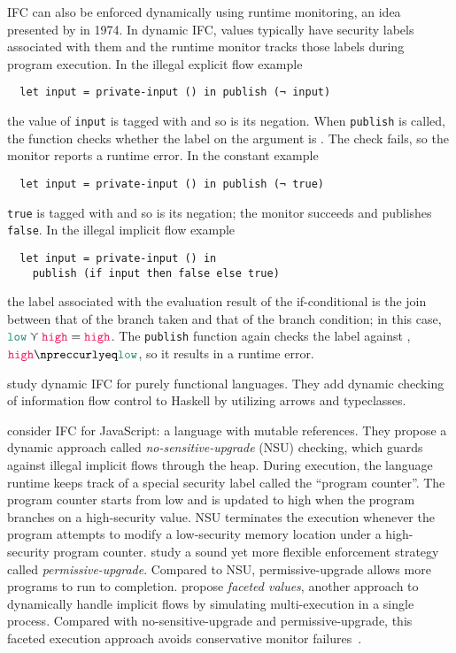 IFC can also be enforced dynamically using runtime monitoring, an idea presented
by \textcite{fenton1974memoryless} in 1974. In dynamic IFC, values typically
have security labels associated with them and the runtime monitor tracks those
labels during program execution. In the illegal explicit flow example
\begin{verbatim}
  let input = private-input () in publish (¬ input)
\end{verbatim}
the value of \texttt{input} is tagged with \high and so is its negation. When
\texttt{publish} is called, the function checks whether the label on the
argument is \low. The check fails, so the monitor reports a runtime error. In
the constant example
\begin{verbatim}
  let input = private-input () in publish (¬ true)
\end{verbatim}
\texttt{true} is tagged with \low and so is its negation; the monitor succeeds
and publishes \texttt{false}. In the illegal implicit flow example
\begin{verbatim}
  let input = private-input () in
    publish (if input then false else true)
\end{verbatim}
the label associated with the evaluation result of the if-conditional is the
join between that of the branch taken and that of the branch condition; in this
case, $\low \curlyvee \high = \high$. The \texttt{publish} function again checks
the label against \low, $\high \npreccurlyeq \low$, so it results in a runtime
error.

\textcite{li2006encoding,LI20101974} study dynamic IFC for purely functional
languages. They add dynamic checking of information flow control to Haskell by
utilizing arrows and typeclasses.

\textcite{austin2009efficient} consider IFC for JavaScript: a language with
mutable references. They propose a dynamic approach called
\textit{no-sensitive-upgrade} (NSU) checking, which guards against illegal
implicit flows through the heap. During execution, the language runtime keeps
track of a special security label called the ``program counter''. The program
counter starts from low and is updated to high when the program branches on a
high-security value. NSU terminates the execution whenever the program attempts
to modify a low-security memory location under a high-security program counter.
\textcite{austin2010permissive} study a sound yet more flexible enforcement
strategy called \textit{permissive-upgrade}. Compared to NSU, permissive-upgrade
allows more programs to run to completion. \textcite{austin2012multiple} propose
\textit{faceted values}, another approach to dynamically handle implicit flows
by simulating multi-execution in a single process. Compared with
no-sensitive-upgrade and permissive-upgrade, this faceted execution approach
avoids conservative monitor failures~\parencite{Austin:2017uh}.

